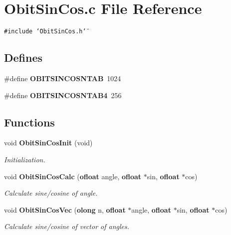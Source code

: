 \section{Obit\-Sin\-Cos.c File Reference}
\label{ObitSinCos_8c}
{\tt \#include \char`\"{}Obit\-Sin\-Cos.h\char`\"{}}\par
\subsection*{Defines}
\begin{CompactItemize}
\item 
\#define {\bf OBITSINCOSNTAB}\ 1024
\item 
\#define {\bf OBITSINCOSNTAB4}\ 256
\end{CompactItemize}
\subsection*{Functions}
\begin{CompactItemize}
\item 
void {\bf Obit\-Sin\-Cos\-Init} (void)
\begin{CompactList}\small\item\em Initialization. \item\end{CompactList}\item 
void {\bf Obit\-Sin\-Cos\-Calc} ({\bf ofloat} angle, {\bf ofloat} $\ast$sin, {\bf ofloat} $\ast$cos)
\begin{CompactList}\small\item\em Calculate sine/cosine of angle. \item\end{CompactList}\item 
void {\bf Obit\-Sin\-Cos\-Vec} ({\bf olong} n, {\bf ofloat} $\ast$angle, {\bf ofloat} $\ast$sin, {\bf ofloat} $\ast$cos)
\begin{CompactList}\small\item\em Calculate sine/cosine of vector of angles. \item\end{CompactList}\end{CompactItemize}
